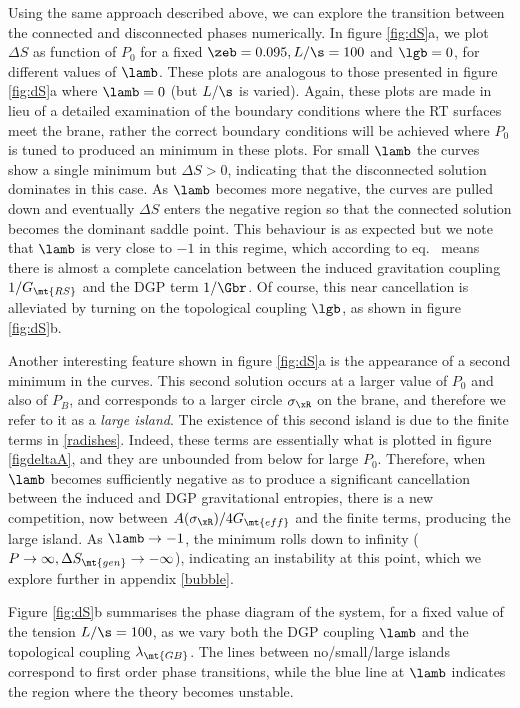 Using the same approach described above, we can explore the transition between the connected and disconnected phases numerically. In figure \ref{fig:dS}a, we plot $\Delta S$ as function of $P_0$ for a fixed $\zeb=0.095,L/\s=100$ and $\lgb=0$, for different values of $\lamb$. These plots are analogous to those presented in figure \ref{fig:dS}a where $\lamb=0$ (but $L/\s$ is varied). Again, these plots are made in lieu of a detailed examination of the boundary conditions where the RT surfaces meet the brane, rather the correct boundary conditions  will be achieved where $P_0$ is tuned to produced an minimum in these plots. For small $\lamb$ the curves show a single minimum but $\Delta S>0$, indicating that the disconnected solution dominates in this case. As $\lamb$ becomes more negative, the curves are pulled down and eventually $\Delta S$ enters the negative region so that the connected solution becomes the dominant saddle point. This behaviour is as expected but we note that $\lamb$ is very close to $-1$ in this regime, which according to eq.~ means there is almost a complete cancelation between the induced gravitation coupling $1/G_\mt{RS}$ and the DGP term $1/\Gbr$. Of course, this near cancellation is alleviated by turning on the topological coupling $\lgb$, as shown in figure \ref{fig:dS}b. 

Another interesting feature shown in figure \ref{fig:dS}a is the appearance of a second minimum in the curves. This second solution occurs at a larger value of $P_0$ and also of $P_B$, and corresponds to a larger circle $\sigma_\xR$ on the brane, and therefore we refer to it as a \textit{large island}. The existence of this second island is due to the finite terms in \eqref{radishes}. Indeed, these terms are essentially what is plotted in figure \ref{figdeltaA}, and they are unbounded from below for large $P_0$. Therefore, when $\lamb$ becomes sufficiently negative as to produce a significant cancellation between the induced and DGP gravitational entropies, there is a new competition, now between $A(\sigma_\xR)/4G_\mt{eff}$ and the finite terms, producing the large island. As $\lamb\to-1$, the minimum rolls down to infinity ($P\to \infty,\Delta S_{\mt{gen}}\to-\infty$), indicating an instability at this point, which we explore further in appendix \ref{bubble}.

Figure \ref{fig:dS}b summarises the phase diagram of the system, for a fixed value of the tension $L/\s=100$, as we vary both the DGP coupling $\lamb$ and the topological coupling $\lambda_{\mt{GB}}$. The lines between no/small/large islands correspond to first order phase transitions, while the blue line at $\lamb$ indicates the region where the theory becomes unstable. 


